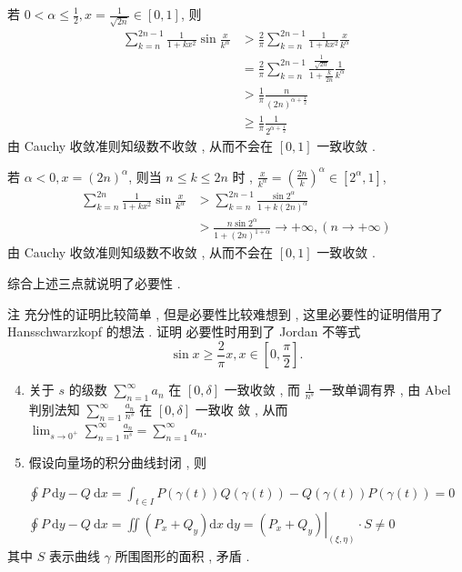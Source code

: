 \documentclass[10pt]{article}
\begin{document}
 若  $0<\alpha \leqslant \frac{1}{2}, x=\frac{1}{\sqrt{2 n}} \in[0,1]$,  则 
$$
\begin{aligned}
\sum_{k=n}^{2 n-1} \frac{1}{1+k x^{2}} \sin \frac{x}{k^{\alpha}} &>\frac{2}{\pi} \sum_{k=n}^{2 n-1} \frac{1}{1+k x^{2}} \frac{x}{k^{\alpha}} \\
&=\frac{2}{\pi} \sum_{k=n}^{2 n-1} \frac{\frac{1}{\sqrt{2 n}}}{1+\frac{k}{2 n}} \frac{1}{k^{\alpha}} \\
&>\frac{1}{\pi} \frac{n}{(2 n)^{\alpha+\frac{1}{2}}} \\
& \geqslant \frac{1}{\pi} \frac{1}{2^{\alpha+\frac{1}{2}}}
\end{aligned}
$$
 由  Cauchy  收敛准则知级数不收敛 ,  从而不会在  $[0,1]$  一致收敛 .

 若  $\alpha<0, x=(2 n)^{\alpha}$,  则当  $n \leqslant k \leqslant 2 n$  时 , $\frac{x}{k^{\alpha}}=\left(\frac{2 n}{k}\right)^{\alpha} \in\left[2^{\alpha}, 1\right]$,
$$
\begin{aligned}
\sum_{k=n}^{2 n} \frac{1}{1+k x^{2}} \sin \frac{x}{k^{\alpha}} &>\sum_{k=n}^{2 n-1} \frac{\sin 2^{\alpha}}{1+k(2 n)^{\alpha}} \\
&>\frac{n \sin 2^{\alpha}}{1+(2 n)^{1+\alpha}} \rightarrow+\infty,(n \rightarrow+\infty)
\end{aligned}
$$
 由  Cauchy  收敛准则知级数不收敛 ,  从而不会在  $[0,1]$  一致收敛 .

 综合上述三点就说明了必要性 .

 注   充分性的证明比较简单 ,  但是必要性比较难想到 ,  这里必要性的证明借用了  Hansschwarzkopf  的想法 .  证明   必要性时用到了  Jordan  不等式 
$$
\sin x \geqslant \frac{2}{\pi} x, x \in\left[0, \frac{\pi}{2}\right] .
$$

\begin{enumerate}
  \setcounter{enumi}{3}
  \item  关于  $s$  的级数  $\sum_{n=1}^{\infty} a_{n}$  在  $[0, \delta]$  一致收敛 ,  而  $\frac{1}{n^{s}}$  一致单调有界 ,  由  Abel  判别法知  $\sum_{n=1}^{\infty} \frac{a_{n}}{n^{s}}$  在  $[0, \delta]$  一致收   敛 ,  从而  $\lim _{s \rightarrow 0^{+}} \sum_{n=1}^{\infty} \frac{a_{n}}{n^{s}}=\sum_{n=1}^{\infty} a_{n}$.

  \item  假设向量场的积分曲线封闭 ,  则 

\end{enumerate}
$$
\begin{aligned}
&\oint P \mathrm{~d} y-Q \mathrm{~d} x=\int_{t \in I} P(\gamma(t)) Q(\gamma(t))-Q(\gamma(t)) P(\gamma(t))=0 \\
&\oint P \mathrm{~d} y-Q \mathrm{~d} x=\iint\left(P_{x}+Q_{y}\right) \mathrm{d} x \mathrm{~d} y=\left.\left(P_{x}+Q_{y}\right)\right|_{(\xi, \eta)} \cdot S \neq 0
\end{aligned}
$$
 其中  $S$  表示曲线  $\gamma$  所围图形的面积 ,  矛盾 .
\end{document}

